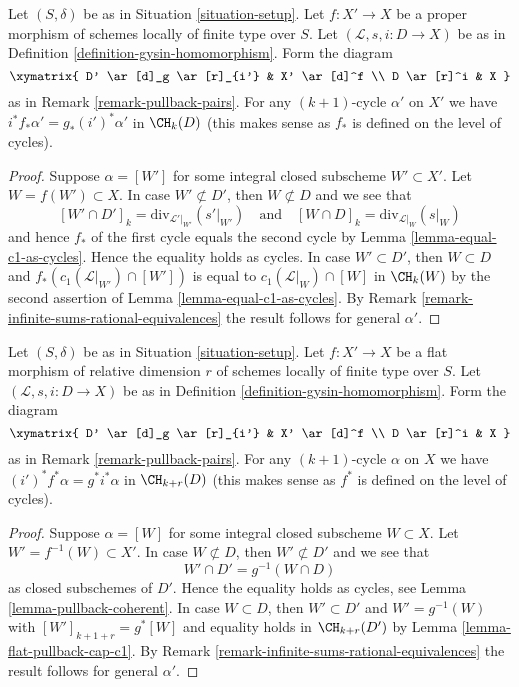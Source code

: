 \begin{lemma}
\label{lemma-closed-in-X-gysin}
Let $(S, \delta)$ be as in Situation \ref{situation-setup}.
Let $f : X' \to X$ be a proper morphism of schemes
locally of finite type over $S$.
Let $(\mathcal{L}, s, i : D \to X)$ be as in
Definition \ref{definition-gysin-homomorphism}.
Form the diagram
$$
\xymatrix{
D' \ar[d]_g \ar[r]_{i'} & X' \ar[d]^f \\
D \ar[r]^i & X
}
$$
as in Remark \ref{remark-pullback-pairs}.
For any $(k + 1)$-cycle $\alpha'$ on $X'$ we have
$i^*f_*\alpha' = g_*(i')^*\alpha'$ in $\CH_k(D)$
(this makes sense as $f_*$ is defined on the level of cycles).
\end{lemma}

\begin{proof}
Suppose $\alpha = [W']$ for some integral closed subscheme
$W' \subset X'$. Let $W = f(W') \subset X$. In case $W' \not \subset D'$,
then $W \not \subset D$ and we see that
$$
[W' \cap D']_k = \text{div}_{\mathcal{L}'|_{W'}}({s'|_{W'}})
\quad\text{and}\quad
[W \cap D]_k = \text{div}_{\mathcal{L}|_W}(s|_W)
$$
and hence $f_*$ of the first cycle equals the second cycle by
Lemma \ref{lemma-equal-c1-as-cycles}. Hence the
equality holds as cycles. In case $W' \subset D'$, then
$W \subset D$ and $f_*(c_1(\mathcal{L}|_{W'}) \cap [W'])$
is equal to $c_1(\mathcal{L}|_W) \cap [W]$ in $\CH_k(W)$ by the second
assertion of Lemma \ref{lemma-equal-c1-as-cycles}.
By Remark \ref{remark-infinite-sums-rational-equivalences}
the result follows for general $\alpha'$.
\end{proof}

\begin{lemma}
\label{lemma-gysin-flat-pullback}
Let $(S, \delta)$ be as in Situation \ref{situation-setup}. Let $f : X' \to X$
be a flat morphism of relative dimension $r$ of schemes locally of finite type
over $S$. Let $(\mathcal{L}, s, i : D \to X)$ be as in
Definition \ref{definition-gysin-homomorphism}. Form the diagram
$$
\xymatrix{
D' \ar[d]_g \ar[r]_{i'} & X' \ar[d]^f \\
D \ar[r]^i & X
}
$$
as in Remark \ref{remark-pullback-pairs}.
For any $(k + 1)$-cycle $\alpha$ on $X$ we have
$(i')^*f^*\alpha = g^*i^*\alpha$ in $\CH_{k + r}(D)$
(this makes sense as $f^*$ is defined on the level of cycles).
\end{lemma}

\begin{proof}
Suppose $\alpha = [W]$ for some integral closed subscheme
$W \subset X$. Let $W' = f^{-1}(W) \subset X'$. In case $W \not \subset D$,
then $W' \not \subset D'$ and we see that
$$
W' \cap D' = g^{-1}(W \cap D)
$$
as closed subschemes of $D'$. Hence the
equality holds as cycles, see Lemma \ref{lemma-pullback-coherent}.
In case $W \subset D$, then $W' \subset D'$ and $W' = g^{-1}(W)$
with $[W']_{k + 1 + r} = g^*[W]$ and equality holds in
$\CH_{k + r}(D')$ by Lemma \ref{lemma-flat-pullback-cap-c1}.
By Remark \ref{remark-infinite-sums-rational-equivalences}
the result follows for general $\alpha'$.
\end{proof}








